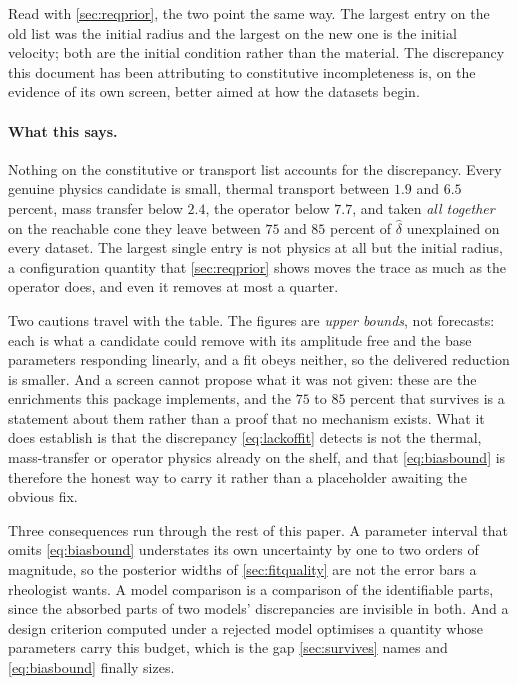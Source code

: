\documentclass[10pt]{article}
\begin{document}
Read with \cref{sec:reqprior}, the two point the same way. The largest entry on the old list was
the initial radius and the largest on the new one is the initial velocity; both are the initial
condition rather than the material. The discrepancy this document has been attributing to
constitutive incompleteness is, on the evidence of its own screen, better aimed at how the
datasets begin.

\paragraph{What this says.} Nothing on the constitutive or transport list accounts for the discrepancy. Every genuine
physics candidate is small, thermal transport between $1.9$ and $6.5$ percent, mass transfer
below $2.4$, the operator below $7.7$, and taken \emph{all together} on the reachable cone
they leave between $75$ and $85$ percent of $\hat\delta$ unexplained on every dataset. The
largest single entry is not physics at all but the initial radius, a configuration quantity
that \cref{sec:reqprior} shows moves the trace as much as the operator does, and even it
removes at most a quarter.

Two cautions travel with the table. The figures are \emph{upper bounds}, not forecasts: each is
what a candidate could remove with its amplitude free and the base parameters responding
linearly, and a fit obeys neither, so the delivered reduction is smaller. And a screen cannot
propose what it was not given: these are the enrichments this package implements, and the
$75$ to $85$ percent that survives is a statement about them rather than a proof that no
mechanism exists. What it does establish is that the discrepancy \cref{eq:lackoffit} detects is
not the thermal, mass-transfer or operator physics already on the shelf, and that
\eqref{eq:biasbound} is therefore the honest way to carry it rather than a placeholder awaiting
the obvious fix.

Three consequences run through the rest of this paper. A parameter interval that omits
\eqref{eq:biasbound} understates its own uncertainty by one to two orders of magnitude, so the
posterior widths of \cref{sec:fitquality} are not the error bars a rheologist wants. A model
comparison is a comparison of the identifiable parts, since the absorbed parts of two models'
discrepancies are invisible in both. And a design criterion computed under a rejected model
optimises a quantity whose parameters carry this budget, which is the gap
\cref{sec:survives} names and \eqref{eq:biasbound} finally sizes.
\end{document}
